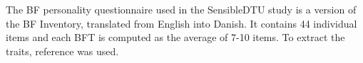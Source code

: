 The BF personality questionnaire used in the SensibleDTU study is a version of the BF Inventory, translated from English into Danish. It contains 44 individual items and each BFT is computed as the average of 7-10 items. To extract the traits, reference \cite{facet54big} was used.